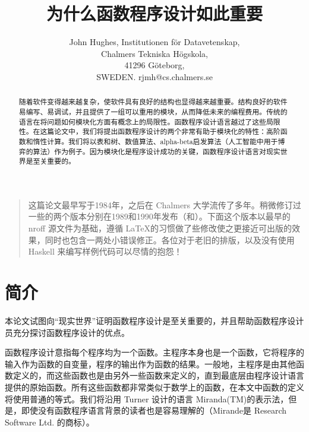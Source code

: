 \documentclass[12pt,a4paper]{article}
\begin{document}
\title{为什么函数程序设计如此重要}
\author{John Hughes, Institutionen f\"or Datavetenskap,\\
Chalmers Tekniska H\"ogskola,\\
41296 G\"oteborg,\\
SWEDEN. rjmh@cs.chalmers.se}
\date{}

\maketitle

\begin{quotation}这篇论文最早写于1984年，之后在 Chalmers 大学流传了多年。稍微修订过一些的两个版本分别在1989和1990年发布（\cite[Hug89]{Hug89}和\cite[Hug90]{Hug90}）。下面这个版本以最早的 nroff 源文件为基础，遵循 \LaTeX 的习惯做了些修改使之更接近可出版的效果，同时也包含一两处小错误修正。各位对于老旧的排版，以及没有使用 Haskell 来编写样例代码可以尽情的抱怨！\end{quotation}

\begin{abstract}随着软件变得越来越复杂，使软件具有良好的结构也显得越来越重要。结构良好的软件易编写、易调试，并且提供了一组可以重用的模块，从而降低未来的编程费用。传统的语言在将问题如何模块化方面有概念上的局限性。函数程序设计语言越过了这些局限性。在这篇论文中，我们将提出函数程序设计的两个非常有助于模块化的特性：高阶函数和惰性计算。我们将以表和树、数值算法、alpha-beta启发算法（人工智能中用于博弈的算法）作为例子。因为模块化是程序设计成功的关键，函数程序设计语言对现实世界是至关重要的。\end{abstract}

\clearpage

\tableofcontents

\clearpage

\section{简介}

本论文试图向``现实世界''证明函数程序设计是至关重要的，并且帮助函数程序设计员充分探讨函数程序设计的优点。

函数程序设计意指每个程序均为一个函数。主程序本身也是一个函数，它将程序的输入作为函数的自变量，程序的输出作为函数的结果。一般地，主程序是由其他函数定义的，而这些函数也是由另外一些函数来定义的，直到最底层由程序设计语言提供的原始函数。所有这些函数都非常类似于数学上的函数，在本文中函数的定义将使用普通的等式。我们将沿用 Turner 设计的语言 Miranda(TM)\cite[Tur85]{Tur85}的表示法，但是，即使没有函数程序语言背景的读者也是容易理解的（Mirande是 Research Software Ltd. 的商标）。
\end{document}
